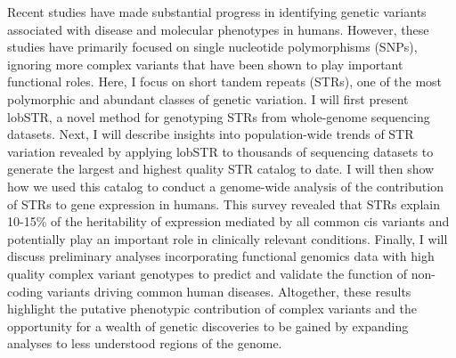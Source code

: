 % 
% 
%
Recent studies have made substantial progress in identifying genetic variants associated with disease and molecular phenotypes in humans. However, these studies have primarily focused on single nucleotide polymorphisms (SNPs), ignoring more complex variants that have been shown to play important functional roles. Here, I focus on short tandem repeats (STRs), one of the most polymorphic and abundant classes of genetic variation. I will first present lobSTR, a novel method for genotyping STRs from whole-genome sequencing datasets. Next, I will describe insights into population-wide trends of STR variation revealed by applying lobSTR to thousands of sequencing datasets to generate the largest and highest quality STR catalog to date. I will then show how we used this catalog to conduct a genome-wide analysis of the contribution of STRs to gene expression in humans. This survey revealed that STRs explain 10-15\% of the heritability of expression mediated by all common cis variants and potentially play an important role in clinically relevant conditions. Finally, I will discuss preliminary analyses incorporating functional genomics data with high quality complex variant genotypes to predict and validate the function of non-coding variants driving common human diseases. Altogether, these results highlight the putative phenotypic contribution of complex variants and the opportunity for a wealth of genetic discoveries to be gained by expanding analyses to less understood regions of the genome.